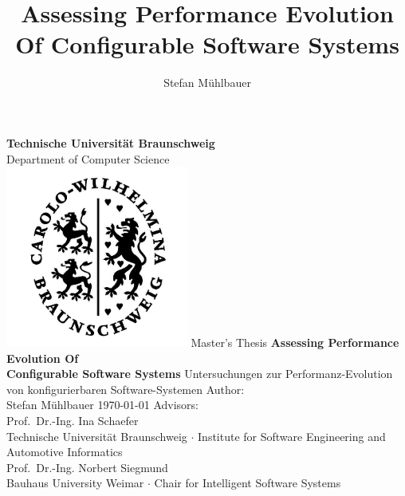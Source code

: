 \documentclass[
	12pt,
	a4paper,
	oneside,
	openright
]{scrbook}
\title{Assessing Performance Evolution Of Configurable Software Systems}
\author{Stefan Mühlbauer}
\begin{document}
\newtheorem{definition}{Def.~}[section]

\begin{titlepage}
    \centering
    {
    	\textbf{Technische Universität Braunschweig}\\ 
    		\vspace{2mm}
    	Department of Computer Science
    }
    \vspace{1.5cm}\\
    \includegraphics[width=6cm]{images/SiegelTU.png}%
    \vfill
    Master's Thesis
    \vfill
    {\bfseries\Huge\linespread{2.0}
        Assessing Performance Evolution Of\\
        	\vspace{3mm}
         Configurable Software Systems
    }  
    \vfill
    {Untersuchungen zur Performanz-Evolution von konfigurierbaren
    Software-Systemen}
    \vfill
    {
    	Author:\\
    	\vspace{3mm}
    	{\Large Stefan Mühlbauer}
    }
    \vfill
    \today
    \vfill
    Advisors:\\
    \vspace{3mm}
    {\large Prof.~Dr.-Ing. Ina Schaefer}\\
    \vspace{1mm}
    {Technische Universität Braunschweig $\cdot$ Institute for Software
    Engineering and Automotive Informatics}\\
    \vspace{3mm}
    {\large Prof.~Dr.-Ing. Norbert Siegmund}\\
    \vspace{1mm}
    {Bauhaus University Weimar $\cdot$ Chair for Intelligent Software Systems}
\end{titlepage}
\end{document}
